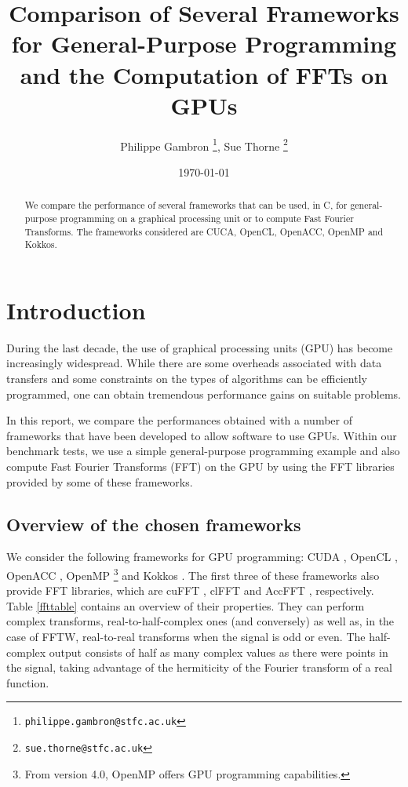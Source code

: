 \documentclass[12pt, a4paper]{article}
\date{}
\begin{document}
\title{Comparison of Several Frameworks for General-Purpose Programming and the  Computation of FFTs on GPUs}
\author{Philippe Gambron \thanks{\texttt{philippe.gambron{@}stfc.ac.uk}}, Sue Thorne \thanks{\texttt{sue.thorne{@}stfc.ac.uk}}}
\date{\today}
\maketitle
\begin{abstract}
We compare the performance of several frameworks that can be used, in
C, for general-purpose programming on a graphical processing unit or
to compute Fast Fourier Transforms. The frameworks considered are
CUCA, OpenCL, OpenACC, OpenMP and Kokkos.
\end{abstract}


\section{Introduction}
During the last decade, the use of graphical processing units (GPU)
has become increasingly widespread.  While there are some overheads
associated with data transfers and some constraints
on the types of algorithms can be efficiently programmed, one can
obtain tremendous performance gains on suitable problems.

In this report, we compare the performances obtained with a number of
frameworks that have been developed to allow software to use GPUs.
Within our benchmark tests, we use a simple general-purpose programming
example and also compute Fast Fourier Transforms (FFT) on the GPU by
using the FFT libraries provided by some of these frameworks.

\subsection{Overview of the chosen frameworks}
We consider the following frameworks for GPU programming: CUDA
\cite{cuda}, OpenCL \cite{opencl}, \mbox{OpenACC} \cite{openacc},
OpenMP \cite{openmp}\footnote{From version 4.0, OpenMP offers GPU
  programming capabilities.} and Kokkos \cite{kokkos}. The first three of these
frameworks also provide FFT libraries, which are cuFFT \cite{cufft},
clFFT \cite{clfft} and AccFFT \cite{accfft}, respectively. Table
\ref{ffttable} contains an overview of their properties. They can
perform complex transforms, real-to-half-complex ones (and conversely)
as well as, in the case of FFTW, real-to-real transforms when the
signal is odd or even. The half-complex output consists of half as
many complex values as there were points in the signal, taking
advantage of the hermiticity of the Fourier transform of a real
function.
\end{document}

